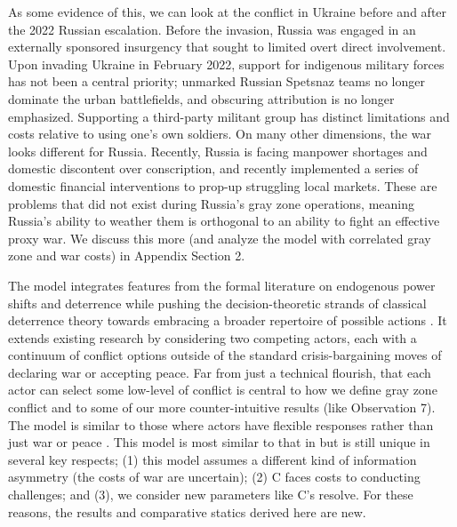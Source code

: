 \documentclass[11pt,letterpaper,pdftex,dvipsnames,table]{article}
\begin{document}
As some evidence of this, we can look at the conflict in Ukraine before and after the 2022 Russian escalation. Before the invasion, Russia was engaged in an externally sponsored insurgency that sought to limited overt direct involvement. Upon invading Ukraine in February 2022, support for indigenous military forces has not been a central priority; unmarked Russian Spetsnaz teams no longer dominate the urban battlefields, and obscuring attribution is no longer emphasized. Supporting a third-party militant group has distinct limitations and costs relative to  using one's own soldiers. On many other dimensions, the war looks different for Russia. Recently, Russia is facing manpower shortages and domestic discontent over conscription, and recently implemented a series of domestic financial interventions to prop-up struggling local markets. These are problems that did not exist during Russia’s gray zone operations, meaning Russia's ability to weather them is orthogonal to an ability to fight an effective proxy war. We discuss this more (and analyze the model with correlated gray zone and war costs) in Appendix Section 2. 

The model integrates features from the formal literature on endogenous power shifts and deterrence \citep{fearon_signalingforeignpolicy_1997, tarar_strategiclogicmilitary_2016, debs_knownunknownspower_2014, gurantz_fearappeasementeffectiveness_2017, baliga_deterrenceimperfectattribution_2020} while pushing the decision-theoretic strands of classical deterrence theory towards embracing a broader repertoire of possible actions \citep{zagare_classicaldeterrencetheory_1996, huth_deterrenceinternationalconflict_1999}. It extends existing research by considering two competing actors, each with a continuum of conflict options outside of the standard crisis-bargaining moves of declaring war or accepting peace. Far from just a technical flourish, that each actor can select some low-level of conflict is central to how we define gray zone conflict and to some of our more counter-intuitive results (like Observation 7). The model is similar to those where actors have flexible responses rather than just war or peace \citep{zagare_deterrencetheoryspiral_1998, werner_deterringinterventionstakes_2000, schultz_enforcementproblemcoercive_2010, slantchev_militarythreatscosts_2011, powell_nuclearbrinkmanshiplimited_2015, tarar_strategiclogicmilitary_2016, mccormack_sanctionspreventivewar_2017, coe_containingroguestheory_2018, spaniel_bargainingbombsuccesses_2019, schram_hasslinghowstates_2021}. This model is most similar to that in \citet{schram_hasslinghowstates_2021} but is still unique in several key respects; (1) this model assumes a different kind of information asymmetry (the costs of war are uncertain); (2) C faces costs to conducting challenges; and (3), we consider new parameters like C's resolve. For these reasons, the results and comparative statics derived here are new.
\end{document}
